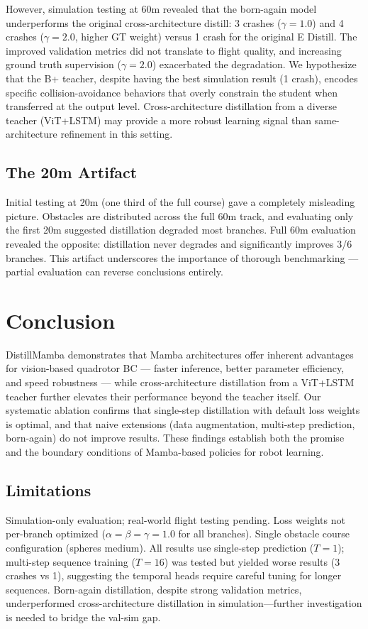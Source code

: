 \documentclass{article}
\newcommand{\method}{DistillMamba\xspace}
\begin{document}
However, simulation testing at 60m revealed that the born-again model underperforms the original cross-architecture distill: 3 crashes ($\gamma=1.0$) and 4 crashes ($\gamma=2.0$, higher GT weight) versus 1 crash for the original E Distill. The improved validation metrics did not translate to flight quality, and increasing ground truth supervision ($\gamma=2.0$) exacerbated the degradation. We hypothesize that the B+ teacher, despite having the best simulation result (1 crash), encodes specific collision-avoidance behaviors that overly constrain the student when transferred at the output level. Cross-architecture distillation from a diverse teacher (ViT+LSTM) may provide a more robust learning signal than same-architecture refinement in this setting.

\subsection{The 20m Artifact}
Initial testing at 20m (one third of the full course) gave a completely misleading picture. Obstacles are distributed across the full 60m track, and evaluating only the first 20m suggested distillation degraded most branches. Full 60m evaluation revealed the opposite: distillation never degrades and significantly improves 3/6 branches. This artifact underscores the importance of thorough benchmarking --- partial evaluation can reverse conclusions entirely.

\section{Conclusion}
\method demonstrates that Mamba architectures offer inherent advantages for vision-based quadrotor BC --- faster inference, better parameter efficiency, and speed robustness --- while cross-architecture distillation from a ViT+LSTM teacher further elevates their performance beyond the teacher itself. Our systematic ablation confirms that single-step distillation with default loss weights is optimal, and that naive extensions (data augmentation, multi-step prediction, born-again) do not improve results. These findings establish both the promise and the boundary conditions of Mamba-based policies for robot learning.

\subsection{Limitations}
Simulation-only evaluation; real-world flight testing pending. Loss weights not per-branch optimized ($\alpha=\beta=\gamma=1.0$ for all branches). Single obstacle course configuration (spheres medium). All results use single-step prediction ($T=1$); multi-step sequence training ($T=16$) was tested but yielded worse results (3 crashes vs 1), suggesting the temporal heads require careful tuning for longer sequences. Born-again distillation, despite strong validation metrics, underperformed cross-architecture distillation in simulation---further investigation is needed to bridge the val-sim gap.



\end{document}
